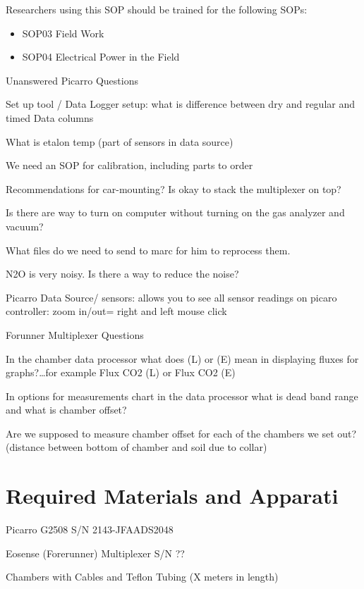 \documentclass[12pt]{../SOP3}\usepackage[]{graphicx}\usepackage[]{color}
\begin{document}
Researchers using this SOP should be trained for the following SOPs:

\begin{itemize}
  \item SOP03 Field Work
  \item SOP04 Electrical Power in the Field
\end{itemize}

Unanswered Picarro Questions

\NP Set up tool / Data Logger setup: what is difference between dry and regular and timed Data columns

\NP What is etalon temp (part of sensors in data source)

\NP We need an SOP for calibration, including parts to order

\NP Recommendations for car-mounting? Is okay to stack the multiplexer on top?

\NP Is there are way to turn on computer without turning on the gas analyzer and vacuum? 

\NP What files do we need to send to marc for him to reprocess them.

\NP N2O is very noisy. Is there a way to reduce the noise?

Picarro
Data Source/ sensors: allows you to see all sensor readings on picaro
controller: zoom in/out= right and left mouse click






Forunner Multiplexer Questions

\NP In the chamber data processor what does (L) or (E) mean in displaying fluxes for graphs?\ldots for example Flux CO2 (L) or Flux CO2 (E) 

\NP In options for measurements chart in the data processor what is dead band range and what is chamber offset? 

\NP Are we supposed to measure chamber offset for each of the chambers we set out? (distance between bottom of chamber and soil due to collar)


\section{Required Materials and Apparati}

\NP Picarro G2508 S/N 2143-JFAADS2048

\NP Eosense (Forerunner) Multiplexer S/N ??

\NP Chambers with Cables and Teflon Tubing (X meters in length)
\end{document}
